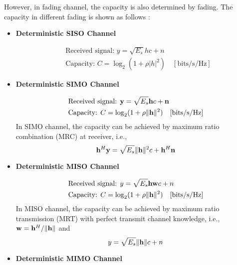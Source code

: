 However, in fading channel, the capacity is also determined by fading. The capacity in different fading is shown as follows \cite{clerckx2013mimo}:
\begin{itemize}
    \item \textbf{Deterministic SISO Channel}
    
    \begin{align}
        &\text{Received signal: } y = \sqrt{E_s} h c + n \\
        &\text{Capacity: } C = \log_2(1+\rho|h|^2) \quad [\mathrm{bits/s/Hz}]
    \end{align}
    

    
    \item \textbf{Deterministic SIMO Channel}
    
    \begin{align}
        &\text{Received signal: } {\bf y} = \sqrt{E_s} {\bf h} c + {\bf n} \\
        &\text{Capacity: } C = \log_2(1+\rho\|{\bf h}\|^2) \quad [\mathrm{bits/s/Hz}]
    \end{align}
    In SIMO channel, the capacity can be achieved by maximum ratio combination (MRC) at receiver, i.e.,
    \begin{equation}
        {\bf h}^H {\bf y} = \sqrt{E_s} \|{\bf h}\|^2 c + {\bf h}^H {\bf n}
    \end{equation}

    \item \textbf{Deterministic MISO Channel}
    
    \begin{align}
        &\text{Received signal: } y = \sqrt{E_s} {\bf h} {\bf w}c + n \\
        &\text{Capacity: } C = \log_2 (1+\rho\|{\bf h}\|^2) \quad [\mathrm{bits/s/Hz}]
    \end{align}
    In MISO channel, the capacity can be achieved by maximum ratio transmission (MRT) with perfect transmit channel knowledge, i.e.,
    ${\bf w} = {\bf h}^H/\|{\bf h}\|$ and   
    \begin{equation}
        y = \sqrt{E_s} \|{\bf h}\| c + n
    \end{equation}

    \item \textbf{Deterministic MIMO Channel}


\end{itemize}
